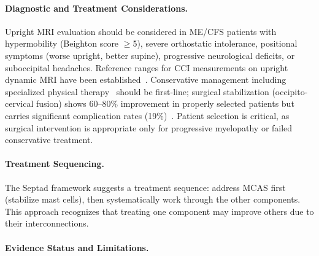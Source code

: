 \paragraph{Diagnostic and Treatment Considerations.}
Upright MRI evaluation should be considered in ME/CFS patients with hypermobility (Beighton score $\geq$5), severe orthostatic intolerance, positional symptoms (worse upright, better supine), progressive neurological deficits, or suboccipital headaches. Reference ranges for CCI measurements on upright dynamic MRI have been established~\cite{Nicholson2023}. Conservative management including specialized physical therapy~\cite{Russek2023} should be first-line; surgical stabilization (occipito-cervical fusion) shows 60--80\% improvement in properly selected patients but carries significant complication rates (19\%)~\cite{Henderson2024,Lohkamp2022}. Patient selection is critical, as surgical intervention is appropriate only for progressive myelopathy or failed conservative treatment.

\paragraph{Treatment Sequencing.}
The Septad framework suggests a treatment sequence: address MCAS first (stabilize mast cells), then systematically work through the other components. This approach recognizes that treating one component may improve others due to their interconnections.

\paragraph{Evidence Status and Limitations.}

